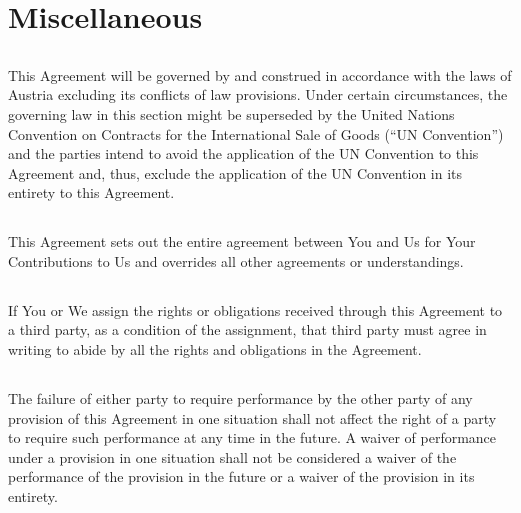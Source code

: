 \documentclass{article}
\begin{document}
\section{Miscellaneous}

\subsection{}

This Agreement will be governed by and construed in accordance with the laws of
Austria excluding its conflicts of law provisions. Under certain circumstances,
the governing law in this section might be superseded by the United Nations
Convention on Contracts for the International Sale of Goods (``UN Convention'')
and the parties intend to avoid the application of the UN Convention to this
Agreement and, thus, exclude the application of the UN Convention in its
entirety to this Agreement.

\subsection{}

This Agreement sets out the entire agreement between You and Us for Your
Contributions to Us and overrides all other agreements or understandings.

\subsection{}

If You or We assign the rights or obligations received through this Agreement to
a third party, as a condition of the assignment, that third party must agree in
writing to abide by all the rights and obligations in the Agreement.

\subsection{}

The failure of either party to require performance by the other party of any
provision of this Agreement in one situation shall not affect the right of a
party to require such performance at any time in the future. A waiver of
performance under a provision in one situation shall not be considered a waiver
of the performance of the provision in the future or a waiver of the provision
in its entirety.

\subsection{}
\end{document}
